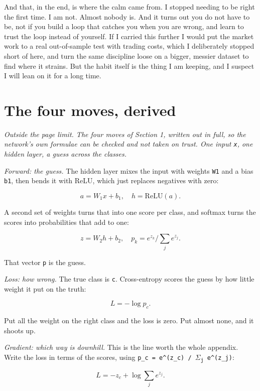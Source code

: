 \documentclass[11pt]{article} %
\begin{document}
And that, in the end, is where the calm came from. I stopped needing to be right the first time. I am not. Almost nobody is. And it turns out you do not have to be, not if you build a loop that catches you when you are wrong, and learn to trust the loop instead of yourself. If I carried this further I would put the market work to a real out-of-sample test with trading costs, which I deliberately stopped short of here, and turn the same discipline loose on a bigger, messier dataset to find where it strains. But the habit itself is the thing I am keeping, and I suspect I will lean on it for a long time.



\appendix


\section{The four moves, derived}


\emph{Outside the page limit. The four moves of Section 1, written out in full, so the network's own formulae can be checked and not taken on trust. One input \texttt{x}, one hidden layer, a guess across the classes.}

\emph{Forward: the guess.} The hidden layer mixes the input with weights \texttt{W1} and a bias \texttt{b1}, then bends it with ReLU, which just replaces negatives with zero:


\[
a = W_{1}x + b_{1}, \quad h = \mathrm{ReLU}(a).
\]


A second set of weights turns that into one score per class, and softmax turns the scores into probabilities that add to one:


\[
z = W_{2}h + b_{2}, \quad p_k = e^{z_k} / \sum_j e^{z_j}.
\]


That vector \texttt{p} is the guess.

\emph{Loss: how wrong.} The true class is \texttt{c}. Cross-entropy scores the guess by how little weight it put on the truth:


\[
L = -\log p_c.
\]


Put all the weight on the right class and the loss is zero. Put almost none, and it shoots up.

\emph{Gradient: which way is downhill.} This is the line worth the whole appendix. Write the loss in terms of the scores, using \texttt{p\_c = e\textasciicircum{}(z\_c) / $\Sigma$\textsubscript{j} e\textasciicircum{}(z\_j)}:


\[
L = -z_c + \log \sum_j e^{z_j}.
\]
\end{document}
